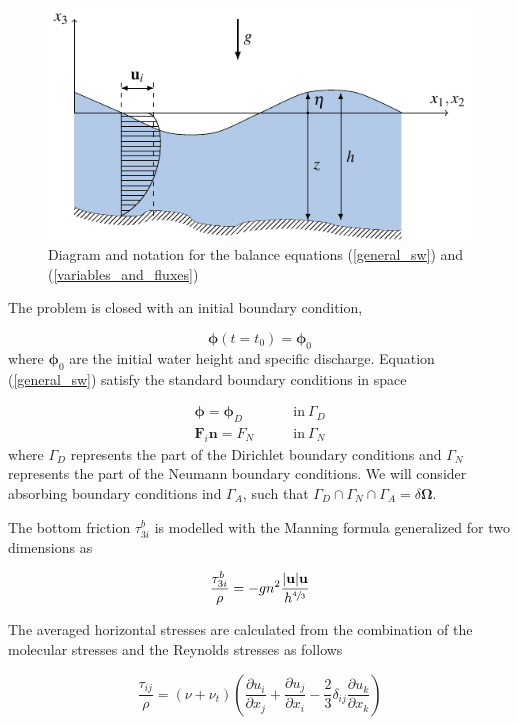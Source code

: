 \documentclass[a4paper,12pt]{article}
\newcommand{\pder}[2]{\frac{\partial#1}{\partial#2}}
\newcommand{\abs}[1]{\lvert#1\rvert}
\begin{document}
\begin{figure}
    \centering
    \includegraphics[width=.8\textwidth]{img/fig/diagram.pdf}
    \caption{Diagram and notation for the balance equations (\ref{general_sw}) and (\ref{variables_and_fluxes})}
    \label{diagram}
\end{figure}

The problem is closed with an initial boundary condition,

\begin{equation}
\bm{\phi}(t=t_0) = \bm{\phi}_0
\end{equation}
where $\bm{\phi}_0$ are the initial water height and specific discharge. Equation (\ref{general_sw}) satisfy the standard boundary conditions in space

\begin{align}
\bm{\phi} = \bm{\phi}_D \qquad &\text{in} \ \Gamma_D \\
\mathbf{F}_i\mathbf{n} = F_N \qquad &\text{in} \ \Gamma_N
\end{align}
where $\Gamma_D$ represents the part of the Dirichlet boundary conditions and $\Gamma_N$ represents the part of the Neumann boundary conditions. We will consider absorbing boundary conditions ind $\Gamma_A$, such that $\Gamma_D \cap \Gamma_N \cap \Gamma_A = \delta\bm{\Omega}$.

The bottom friction $\tau^b_{3i}$ is modelled with the Manning formula generalized for two dimensions as

\begin{equation}
\frac{\tau^b_{3i}}{\rho} = -gn^2\frac{\abs{\mathbf{u}}\mathbf{u}}{h^{\sfrac{4}{3}}}
\end{equation}

The averaged horizontal stresses are calculated from the combination of the molecular stresses and the Reynolds stresses as follows

\begin{equation} \label{stresses}
\frac{\tau_{ij}}{\rho} = (\nu + \nu_t)\left(
    \pder{u_i}{x_j} + \pder{u_j}{x_i} -\frac{2}{3}\delta_{ij}\pder{u_k}{x_k} \right)
\end{equation}
\end{document}
